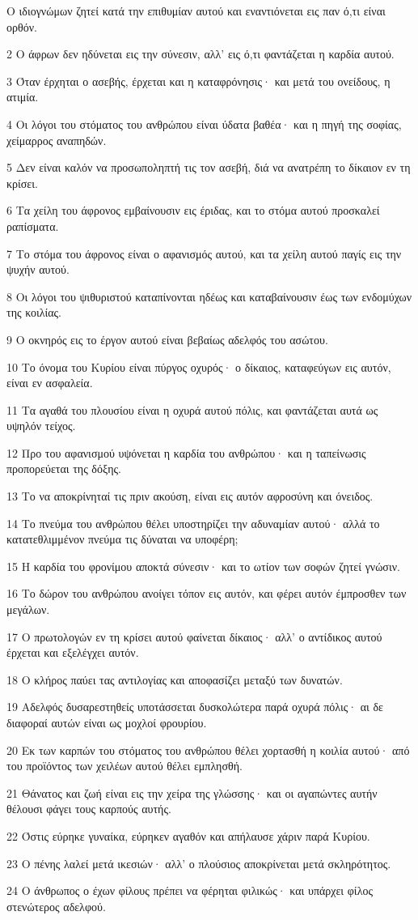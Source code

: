 \par Ο ιδιογνώμων ζητεί κατά την επιθυμίαν αυτού και εναντιόνεται εις παν ό,τι είναι ορθόν.
\par 2 Ο άφρων δεν ηδύνεται εις την σύνεσιν, αλλ' εις ό,τι φαντάζεται η καρδία αυτού.
\par 3 Όταν έρχηται ο ασεβής, έρχεται και η καταφρόνησις· και μετά του ονείδους, η ατιμία.
\par 4 Οι λόγοι του στόματος του ανθρώπου είναι ύδατα βαθέα· και η πηγή της σοφίας, χείμαρρος αναπηδών.
\par 5 Δεν είναι καλόν να προσωποληπτή τις τον ασεβή, διά να ανατρέπη το δίκαιον εν τη κρίσει.
\par 6 Τα χείλη του άφρονος εμβαίνουσιν εις έριδας, και το στόμα αυτού προσκαλεί ραπίσματα.
\par 7 Το στόμα του άφρονος είναι ο αφανισμός αυτού, και τα χείλη αυτού παγίς εις την ψυχήν αυτού.
\par 8 Οι λόγοι του ψιθυριστού καταπίνονται ηδέως και καταβαίνουσιν έως των ενδομύχων της κοιλίας.
\par 9 Ο οκνηρός εις το έργον αυτού είναι βεβαίως αδελφός του ασώτου.
\par 10 Το όνομα του Κυρίου είναι πύργος οχυρός· ο δίκαιος, καταφεύγων εις αυτόν, είναι εν ασφαλεία.
\par 11 Τα αγαθά του πλουσίου είναι η οχυρά αυτού πόλις, και φαντάζεται αυτά ως υψηλόν τείχος.
\par 12 Προ του αφανισμού υψόνεται η καρδία του ανθρώπου· και η ταπείνωσις προπορεύεται της δόξης.
\par 13 Το να αποκρίνηταί τις πριν ακούση, είναι εις αυτόν αφροσύνη και όνειδος.
\par 14 Το πνεύμα του ανθρώπου θέλει υποστηρίζει την αδυναμίαν αυτού· αλλά το κατατεθλιμμένον πνεύμα τις δύναται να υποφέρη;
\par 15 Η καρδία του φρονίμου αποκτά σύνεσιν· και το ωτίον των σοφών ζητεί γνώσιν.
\par 16 Το δώρον του ανθρώπου ανοίγει τόπον εις αυτόν, και φέρει αυτόν έμπροσθεν των μεγάλων.
\par 17 Ο πρωτολογών εν τη κρίσει αυτού φαίνεται δίκαιος· αλλ' ο αντίδικος αυτού έρχεται και εξελέγχει αυτόν.
\par 18 Ο κλήρος παύει τας αντιλογίας και αποφασίζει μεταξύ των δυνατών.
\par 19 Αδελφός δυσαρεστηθείς υποτάσσεται δυσκολώτερα παρά οχυρά πόλις· αι δε διαφοραί αυτών είναι ως μοχλοί φρουρίου.
\par 20 Εκ των καρπών του στόματος του ανθρώπου θέλει χορτασθή η κοιλία αυτού· από του προϊόντος των χειλέων αυτού θέλει εμπλησθή.
\par 21 Θάνατος και ζωή είναι εις την χείρα της γλώσσης· και οι αγαπώντες αυτήν θέλουσι φάγει τους καρπούς αυτής.
\par 22 Όστις εύρηκε γυναίκα, εύρηκεν αγαθόν και απήλαυσε χάριν παρά Κυρίου.
\par 23 Ο πένης λαλεί μετά ικεσιών· αλλ' ο πλούσιος αποκρίνεται μετά σκληρότητος.
\par 24 Ο άνθρωπος ο έχων φίλους πρέπει να φέρηται φιλικώς· και υπάρχει φίλος στενώτερος αδελφού.

